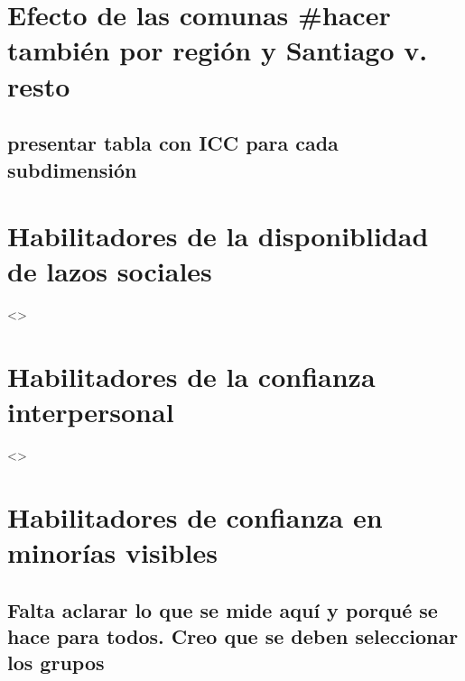 \documentclass[
  12pt,
]{book}
\begin{document}
\hypertarget{efecto-de-las-comunas-hacer-tambiuxe9n-por-regiuxf3n-y-santiago-v.-resto}{%
\section{Efecto de las comunas \#hacer también por región y Santiago v. resto}\label{efecto-de-las-comunas-hacer-tambiuxe9n-por-regiuxf3n-y-santiago-v.-resto}}

\hypertarget{presentar-tabla-con-icc-para-cada-subdimensiuxf3n}{%
\subsection{presentar tabla con ICC para cada subdimensión}\label{presentar-tabla-con-icc-para-cada-subdimensiuxf3n}}

\hypertarget{habilitadores-de-la-disponiblidad-de-lazos-sociales}{%
\section{Habilitadores de la disponiblidad de lazos sociales}\label{habilitadores-de-la-disponiblidad-de-lazos-sociales}}

\textless{}\textgreater{}

\hypertarget{habilitadores-de-la-confianza-interpersonal}{%
\section{Habilitadores de la confianza interpersonal}\label{habilitadores-de-la-confianza-interpersonal}}

\textless{}\textgreater{}

\hypertarget{habilitadores-de-confianza-en-minoruxedas-visibles}{%
\section{Habilitadores de confianza en minorías visibles}\label{habilitadores-de-confianza-en-minoruxedas-visibles}}

\hypertarget{falta-aclarar-lo-que-se-mide-aquuxed-y-porquuxe9-se-hace-para-todos.-creo-que-se-deben-seleccionar-los-grupos}{%
\subsection{Falta aclarar lo que se mide aquí y porqué se hace para todos. Creo que se deben seleccionar los grupos}\label{falta-aclarar-lo-que-se-mide-aquuxed-y-porquuxe9-se-hace-para-todos.-creo-que-se-deben-seleccionar-los-grupos}}
\end{document}
